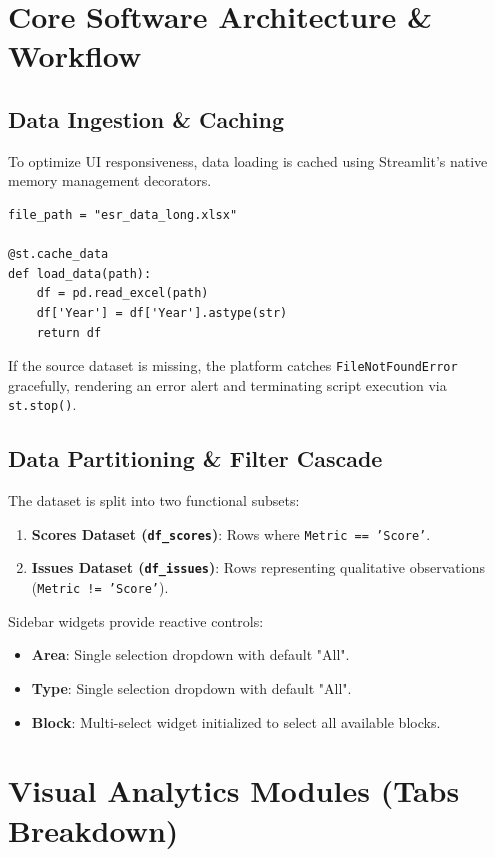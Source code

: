 \documentclass[11pt, a4paper]{article}
\begin{document}
\section{Core Software Architecture \& Workflow}

\subsection{Data Ingestion \& Caching}
To optimize UI responsiveness, data loading is cached using Streamlit's native memory management decorators.

\begin{lstlisting}
file_path = "esr_data_long.xlsx"

@st.cache_data
def load_data(path):
    df = pd.read_excel(path)
    df['Year'] = df['Year'].astype(str)
    return df
\end{lstlisting}

If the source dataset is missing, the platform catches \texttt{FileNotFoundError} gracefully, rendering an error alert and terminating script execution via \texttt{st.stop()}.

\subsection{Data Partitioning \& Filter Cascade}
The dataset is split into two functional subsets:
\begin{enumerate}
    \item \textbf{Scores Dataset (\texttt{df\_scores})}: Rows where \texttt{Metric == 'Score'}.
    \item \textbf{Issues Dataset (\texttt{df\_issues})}: Rows representing qualitative observations (\texttt{Metric != 'Score'}).
\end{enumerate}

Sidebar widgets provide reactive controls:
\begin{itemize}
    \item \textbf{Area}: Single selection dropdown with default "All".
    \item \textbf{Type}: Single selection dropdown with default "All".
    \item \textbf{Block}: Multi-select widget initialized to select all available blocks.
\end{itemize}

\section{Visual Analytics Modules (Tabs Breakdown)}
\end{document}
